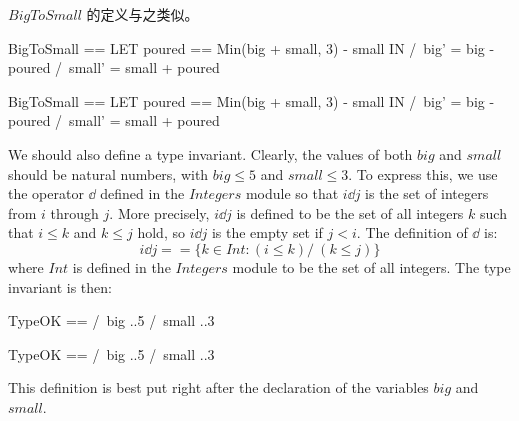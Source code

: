 \begin{ch}
  \tlasubaction{} $BigToSmall$ 的定义与之类似。
 \medskip
  \begin{twocols}
  \begin{notla}
  BigToSmall == 
    LET poured == Min(big + small, 3) - small
    IN  /\ big'   = big - poured
	/\ small' = small + poured
  \end{notla}
  \begin{tlatex}
  \end{tlatex}
  \midcol
  \begin{verbatim*}
  BigToSmall == 
    LET poured == Min(big + small, 3) - small
    IN  /\ big'   = big - poured
	/\ small' = small + poured
  \end{verbatim*}
  \end{twocols}
 \medskip
\end{ch}
\begin{en}
We should also define a type invariant.  Clearly, the values of
both $big$ and $small$ should be natural numbers, with $big\leq 5$
and $small\leq3$.  To express this, we use the operator 
$\dd$ defined in the $Integers$ module so that $i\dd j$ is the set of
integers from $i$ through $j$.  More precisely, $i\dd j$ is defined to
be the set of all integers $k$ such that $i\leq k$ and $k\leq j$ hold,
so $i\dd j$ is the empty set if $j<i$.  The definition of $\dd$ is:%
 \[ i \dd j == \{k \in Int : (i \leq k) /\ (k \leq j)\}
 \]
where 
$Int$ is defined in the $Integers$ module to be the set of all
integers.   The type invariant is then:
 \medskip
\begin{twocols}
\begin{notla}
TypeOK == /\ big   ..5
          /\ small ..3 
\end{notla}
\begin{tlatex}
%
%
\end{tlatex}
\midcol
\begin{verbatim*}
TypeOK == /\ big   ..5
          /\ small ..3 
\end{verbatim*}
\end{twocols}
 \medskip
This definition is best put right after the declaration of the
variables $big$ and $small$.
\end{en}
